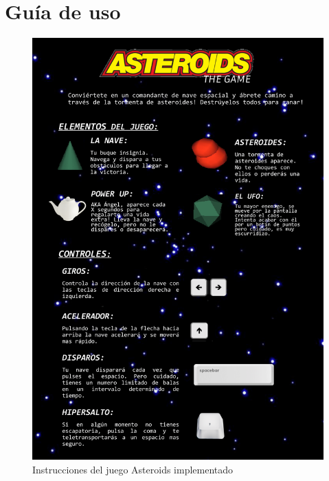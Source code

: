 \section{Guía de uso}

\begin{figure}[h]
    \vspace{-1.85cm}
    \hspace{-1.55cm}
    \includegraphics[width=1.2\textwidth]{fotos/instructions.png}
    \caption{Instrucciones del juego Asteroids implementado}
    \label{instrucciones}
\end{figure}